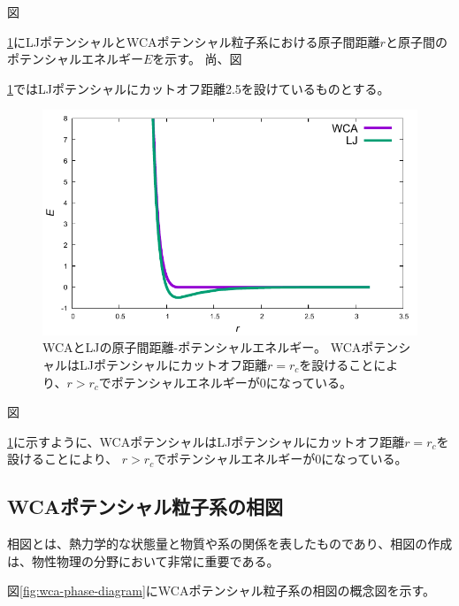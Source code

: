 \documentclass[titlepage]{jsreport}
\begin{document}
図{\ref{fig:dis-poen}にLJポテンシャルとWCAポテンシャル粒子系における原子間距離$r$と原子間のポテンシャルエネルギー$E$を示す。
尚、図{\ref{fig:dis-poen}ではLJポテンシャルにカットオフ距離2.5を設けているものとする。

\newpage
\begin{figure}[htbp]
    \begin{center}
        \includegraphics[width=14cm]{fig/dis-poen.pdf}
    \end{center}
    \caption{WCAとLJの原子間距離-ポテンシャルエネルギー。
    WCAポテンシャルはLJポテンシャルにカットオフ距離$r=r_c$を設けることにより、$r>r_c$でポテンシャルエネルギーが0になっている。}
    \label{fig:dis-poen}
\end{figure}

図{\ref{fig:dis-poen}に示すように、WCAポテンシャルはLJポテンシャルにカットオフ距離$r=r_c$を設けることにより、
$r>r_c$でポテンシャルエネルギーが0になっている。


\subsection{WCAポテンシャル粒子系の相図}\label{method-subsec:WCA-phase}
相図とは、熱力学的な状態量と物質や系の関係を表したものであり、相図の作成は、物性物理の分野において非常に重要である\cite{gaussian-phase}。

図\ref{fig:wca-phase-diagram}にWCAポテンシャル粒子系の相図の概念図を示す。

}}}
\end{document}
